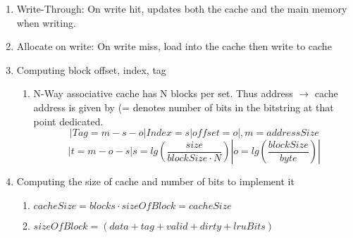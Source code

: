 \documentclass[12pt]{article}
\renewcommand{\=}[1]{\stackrel{#1}{=}} %
\theoremstyle{definition}
\theoremstyle{remark}
\begin{document}
\begin{enumerate}
\begin{enumerate}
    \item Write-Through: On write hit, updates both the cache and the
      main memory  when writing.

    \item Allocate on write: On write miss, load into the cache then write to cache 

    \item Computing block offset, index, tag
      \begin{enumerate}
      \item N-Way associative cache has N blocks per set. Thus
        address $\rightarrow$ cache address is given by (= denotes
        number of bits in the bitstring at that point dedicated.
        \begin{equation}
          |Tag=m-s-o|Index=s|offset=o|, m = addressSize
        \end{equation}
        \begin{equation}
          |t = m-o-s | s = lg(\frac{size}{blockSize\cdot N})|o = lg(\frac{blockSize}{byte})|
        \end{equation}
      \end{enumerate}

    \item Computing the size of cache and number of bits to implement it
      \begin{enumerate}
      \item $cacheSize =  blocks \cdot sizeOfBlock = cacheSize$
      \item $sizeOfBlock =  (data + tag + valid + dirty + lruBits)$
      \end{enumerate}


\end{enumerate}
\end{enumerate}
\end{document}
